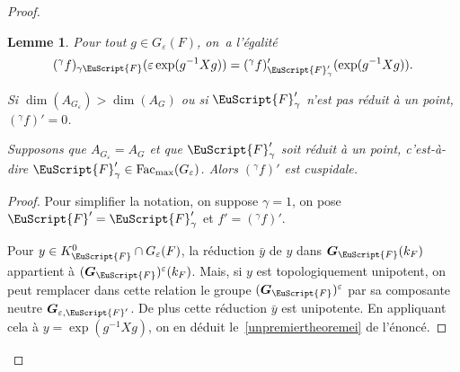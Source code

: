 \documentclass[JEP,XML,SOM,Unicode,francais]{cedram}
\let\mathcal \EuScript
\let\oldenumerate\enumerate
\renewcommand{\enumerate}{\oldenumerate\itemindent0pt}
\newenvironment{enumeratei}
{\bgroup\def\theenumi{\roman{enumi}}\def\theenumii{\arabic{enumii}}\oldenumerate}
{\endenumerate\egroup}
\let\epsilon\varepsilon
\newcommand{\Fac}{\mathrm{Fac}}
\newcommand{\bG}{\boldsymbol{G}}
\newcommand{\cF}{\mathcal{F}}
\theoremstyle{plain}
\newtheorem*{lem*}{Lemme}
\theoremstyle{definition}
\begin{document}
\begin{proof}
\skpt
\begin{lem*}
\begin{enumeratei}
\item\label{unpremiertheoremei}
Pour tout $g\in G_{\epsilon}(F)$, on~a l'égalité
\[
(^{\gamma}f)_{\gamma\cF}(\epsilon \exp(g^{-1} Xg))=(^{\gamma}f)'_{\cF_{\gamma}'}(\exp(g^{-1}Xg)).
\]

\item\label{unpremiertheoremeii}
Si $\dim(A_{G_{\epsilon}})> \dim(A_{G})$ ou si $\cF'_{\gamma}$ n'est pas réduit à un point, $ (^{\gamma}f)'=0$.

\item\label{unpremiertheoremeiii}
Supposons que $A_{G_{\epsilon}}=A_{G}$ et que $\cF'_{\gamma}$ soit réduit à un point, c'est-à-dire $\cF_{\gamma}'\in \Fac_{\max}(G_{\epsilon})$. Alors $(^{\gamma}f)'$ est cuspidale.
\end{enumeratei}
\end{lem*}

\begin{proof}
Pour simplifier la notation, on suppose $\gamma=1$, on pose $\cF'=\cF'_{\gamma}$ et $f'=(^{\gamma}f)'$.

Pour $y\in K_{\cF}^0\cap G_{\epsilon}(F)$, la réduction $\bar{y}$ de $y$ dans $\bG_{\cF}(k_{F})$ appartient à $(\bG_{\cF})^{\epsilon}(k_{F})$. Mais, si $y$ est topologiquement unipotent, on peut remplacer dans cette relation le groupe $(\bG_{\cF})^{\epsilon}$ par sa composante neutre $\bG_{\epsilon,\cF'}$. De plus cette réduction $\bar{y}$ est unipotente. En appliquant cela à $y=\exp(g^{-1}Xg)$, on en déduit le~\eqref{unpremiertheoremei} de l'énoncé.


\end{proof}
\end{proof}
\end{document}
